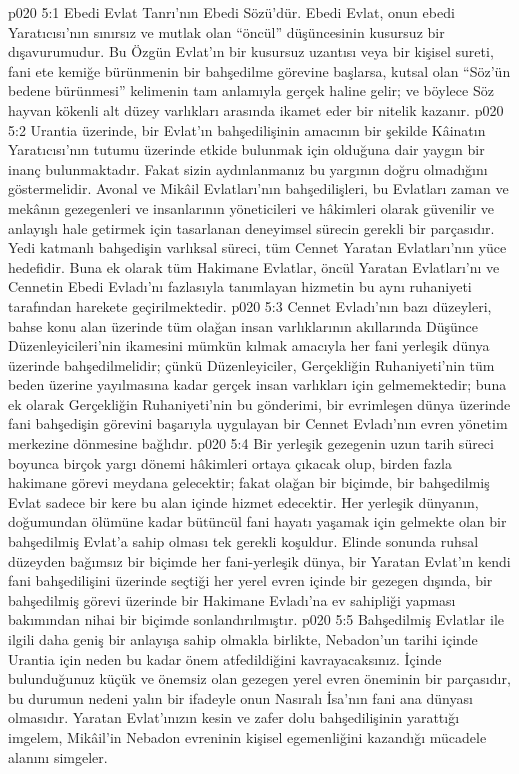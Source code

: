 \vs p020 5:1 Ebedi Evlat Tanrı’nın Ebedi Sözü’dür. Ebedi Evlat, onun ebedi Yaratıcısı’nın sınırsız ve mutlak olan “öncül” düşüncesinin kusursuz bir dışavurumudur. Bu Özgün Evlat’ın bir kusursuz uzantısı veya bir kişisel sureti, fani ete kemiğe bürünmenin bir bahşedilme görevine başlarsa, kutsal olan “Söz’ün bedene bürünmesi” kelimenin tam anlamıyla gerçek haline gelir; ve böylece Söz hayvan kökenli alt düzey varlıkları arasında ikamet eder bir nitelik kazanır.
\vs p020 5:2 Urantia üzerinde, bir Evlat’ın bahşedilişinin amacının bir şekilde Kâinatın Yaratıcısı’nın tutumu üzerinde etkide bulunmak için olduğuna dair yaygın bir inanç bulunmaktadır. Fakat sizin aydınlanmanız bu yargının doğru olmadığını göstermelidir. Avonal ve Mikâil Evlatları’nın bahşedilişleri, bu Evlatları zaman ve mekânın gezegenleri ve insanlarının yöneticileri ve hâkimleri olarak güvenilir ve anlayışlı hale getirmek için tasarlanan deneyimsel sürecin gerekli bir parçasıdır. Yedi katmanlı bahşedişin varlıksal süreci, tüm Cennet Yaratan Evlatları’nın yüce hedefidir. Buna ek olarak tüm Hakimane Evlatlar, öncül Yaratan Evlatları’nı ve Cennetin Ebedi Evladı’nı fazlasıyla tanımlayan hizmetin bu aynı ruhaniyeti tarafından harekete geçirilmektedir.
\vs p020 5:3 Cennet Evladı’nın bazı düzeyleri, bahse konu alan üzerinde tüm olağan insan varlıklarının akıllarında Düşünce Düzenleyicileri’nin ikamesini mümkün kılmak amacıyla her fani yerleşik dünya üzerinde bahşedilmelidir; çünkü Düzenleyiciler, Gerçekliğin Ruhaniyeti’nin tüm beden üzerine yayılmasına kadar  gerçek insan varlıkları için gelmemektedir; buna ek olarak Gerçekliğin Ruhaniyeti’nin bu gönderimi, bir evrimleşen dünya üzerinde fani bahşedişin görevini başarıyla uygulayan bir Cennet Evladı’nın evren yönetim merkezine dönmesine bağlıdır.
\vs p020 5:4 Bir yerleşik gezegenin uzun tarih süreci boyunca birçok yargı dönemi hâkimleri ortaya çıkacak olup, birden fazla hakimane görevi meydana gelecektir; fakat olağan bir biçimde, bir bahşedilmiş Evlat sadece bir kere bu alan içinde hizmet edecektir. Her yerleşik dünyanın, doğumundan ölümüne kadar bütüncül fani hayatı yaşamak için gelmekte olan bir bahşedilmiş Evlat’a sahip olması tek gerekli koşuldur. Elinde sonunda ruhsal düzeyden bağımsız bir biçimde her fani\hyp{}yerleşik dünya, bir Yaratan Evlat’ın kendi fani bahşedilişini üzerinde seçtiği her yerel evren içinde bir gezegen dışında, bir bahşedilmiş görevi üzerinde bir Hakimane Evladı’na ev sahipliği yapması bakımından nihai bir biçimde sonlandırılmıştır.
\vs p020 5:5 Bahşedilmiş Evlatlar ile ilgili daha geniş bir anlayışa sahip olmakla birlikte, Nebadon’un tarihi içinde Urantia için neden bu kadar önem atfedildiğini kavrayacaksınız. İçinde bulunduğunuz küçük ve önemsiz olan gezegen yerel evren öneminin bir parçasıdır, bu durumun nedeni yalın bir ifadeyle onun Nasıralı İsa’nın fani ana dünyası olmasıdır. Yaratan Evlat’ınızın kesin ve zafer dolu bahşedilişinin yarattığı imgelem, Mikâil’in Nebadon evreninin kişisel egemenliğini kazandığı mücadele alanını simgeler.

